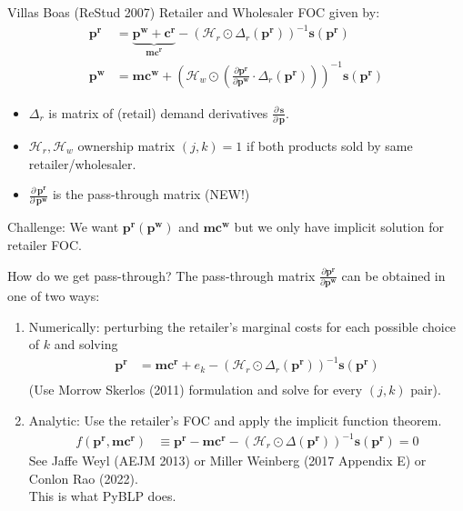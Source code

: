 \begin{frame}{Villas Boas (ReStud 2007)}
Retailer and Wholesaler FOC given by:
\begin{align*}
\mathbf{p^r} &= \underbrace{\mathbf{p^w} +\mathbf{c^r}}_{\mathbf{mc^r}} -(\mathcal{H}_r \odot \Delta_{r}(\mathbf{p^r}))^{-1} \mathbf{s}(\mathbf{p^r})\\
\mathbf{p^w}  &= \mathbf{mc^w} + \left(\mathcal{H}_{w} \odot \left( \frac{\partial \mathbf{p^r}}{\partial \mathbf{p^w}} \cdot  \Delta_r(\mathbf{p^r} ) \right) \right)^{-1} \mathbf{s}(\mathbf{p^r})
\end{align*}
\begin{itemize}
  \item $\Delta_r$ is matrix of (retail) demand derivatives $\frac{\partial\, \mathbf{s}}{\partial\, \mathbf{p}}$.
\item $\mathcal{H}_r,\mathcal{H}_w$  ownership matrix $(j,k)=1$ if both products sold by same retailer/wholesaler.
\item $\frac{\partial\, \mathbf{p^r}}{\partial\, \mathbf{p^w}}$ is the \alert{pass-through matrix} (NEW!)
\end{itemize}
Challenge: We want $\mathbf{p^r}(\mathbf{p^w})$ and $\mathbf{mc^w}$ but we only have implicit solution for retailer FOC.
\end{frame}

\begin{frame}{How do we get pass-through?}
The \alert{pass-through matrix} $\frac{\partial \mathbf{p^r}}{\partial \mathbf{p^w}}$ can be obtained in one of two ways:
\begin{enumerate}
\item Numerically: perturbing the retailer's marginal costs for each possible choice of $k$ and solving
\begin{align*}
\mathbf{p^r} &=\mathbf{mc^r} + e_k -(\mathcal{H}_r \odot \Delta_{r}(\mathbf{p^r}))^{-1} \mathbf{s}(\mathbf{p^r})\\
\end{align*}
(Use Morrow Skerlos (2011) formulation and solve for every $(j,k)$ pair).
\item Analytic: Use the retailer's FOC and apply the implicit function theorem.
\begin{align}
\tag{retailer FOC}
 f(\mathbf{p^r},\mathbf{mc^r}) &\equiv \mathbf{p^r}  - \mathbf{mc^r}-  \left(\mathcal{H}_{r} \odot \Delta(\mathbf{p^r}) \right)^{-1} \mathbf{s}(\mathbf{p^r})=0 
\end{align}
See Jaffe Weyl (AEJM 2013) or Miller Weinberg (2017 Appendix E) or Conlon Rao (2022).\\
\alert{This is what PyBLP does}.
  \end{enumerate}

\end{frame}

